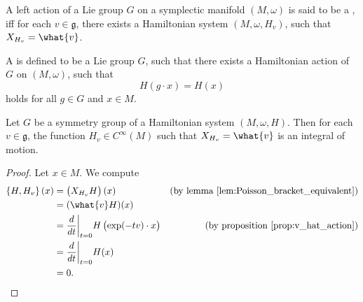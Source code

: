 \begin{definition}
	A left action of a Lie group $G$ on a symplectic manifold $(M,\omega)$ is said to be a , iff for each $v \in \mathfrak{g}$, there exists a Hamiltonian system $(M,\omega,H_v)$, such that $X_{H_v} = \what{v}$. 	
\end{definition}

\begin{definition}
	A  is defined to be a Lie group $G$, such that there exists a Hamiltonian action of $G$ on $(M,\omega)$, such that
	\begin{equation*}
		H(g \cdot x) = H(x)
	\end{equation*}
	\noindent holds for all $g \in G$ and $x \in M$.
\end{definition}

\begin{theorem}[Noether]
	\label{thm:Noether_theorem}
	Let $G$ be a symmetry group of a Hamiltonian system $(M,\omega,H)$. Then for each $v \in \mathfrak{g}$, the function $H_v \in C^\infty(M)$ such that $X_{H_v} = \what{v}$ is an integral of motion.
\end{theorem}

\begin{proof}
	Let $x \in M$. We compute
	\begin{align*}
		\cbr[0]{H,H_v}(x) &= \del[1]{X_{H_v}H}(x) & (\text{by lemma } \ref{lem:Poisson_bracket_equivalent})\\
		&= (\what{v}H)(x)\\
		&= \frac{d}{dt}\bigg\vert_{t = 0}H\del[1]{\exp(-tv) \cdot x} & (\text{by proposition } \ref{prop:v_hat_action})\\
		&= \frac{d}{dt}\bigg\vert_{t = 0}H(x)\\
		&= 0.
	\end{align*}
\end{proof}
